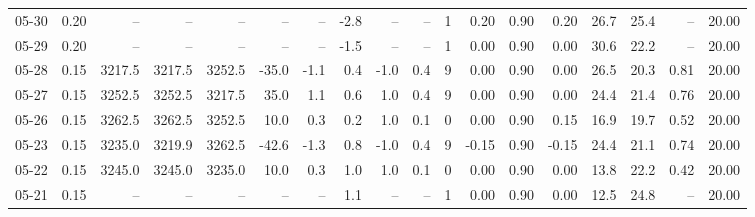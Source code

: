 \begin{threeparttable}
{\begin{tabular}{lrrrrrrrrrrrrrrrrr}
  05-30 &     0.20 &     -- &     -- &     -- &         -- &             -- &                      -2.8 &                       -- &                  -- &              1 &       0.20 &      0.90 &           0.20 &             26.7 &                25.4 &              -- &                  20.00 \\
  05-29 &     0.20 &     -- &     -- &     -- &         -- &             -- &                      -1.5 &                       -- &                  -- &              1 &       0.00 &      0.90 &           0.00 &             30.6 &                22.2 &              -- &                  20.00 \\
  05-28 &     0.15 & 3217.5 & 3217.5 & 3252.5 &      -35.0 &           -1.1 &                       0.4 &                     -1.0 &                 0.4 &              9 &       0.00 &      0.90 &           0.00 &             26.5 &                20.3 &            0.81 &                  20.00 \\
  05-27 &     0.15 & 3252.5 & 3252.5 & 3217.5 &       35.0 &            1.1 &                       0.6 &                      1.0 &                 0.4 &              9 &       0.00 &      0.90 &           0.00 &             24.4 &                21.4 &            0.76 &                  20.00 \\
  05-26 &     0.15 & 3262.5 & 3262.5 & 3252.5 &       10.0 &            0.3 &                       0.2 &                      1.0 &                 0.1 &              0 &       0.00 &      0.90 &           0.15 &             16.9 &                19.7 &            0.52 &                  20.00 \\
  05-23 &     0.15 & 3235.0 & 3219.9 & 3262.5 &      -42.6 &           -1.3 &                       0.8 &                     -1.0 &                 0.4 &              9 &      -0.15 &      0.90 &          -0.15 &             24.4 &                21.1 &            0.74 &                  20.00 \\
  05-22 &     0.15 & 3245.0 & 3245.0 & 3235.0 &       10.0 &            0.3 &                       1.0 &                      1.0 &                 0.1 &              0 &       0.00 &      0.90 &           0.00 &             13.8 &                22.2 &            0.42 &                  20.00 \\
  05-21 &     0.15 &     -- &     -- &     -- &         -- &             -- &                       1.1 &                       -- &                  -- &              1 &       0.00 &      0.90 &           0.00 &             12.5 &                24.8 &              -- &                  20.00 \\

\end{tabular}}
\end{threeparttable}

